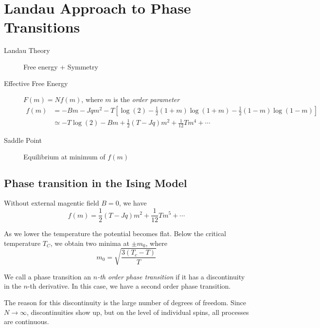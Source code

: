 
\chapter{Landau Approach to Phase Transitions}%
\label{cha:landau_approach_to_phase_transitions}

\begin{description}
  \item[Landau Theory] Free energy + Symmetry
  \item[Effective Free Energy] $F(m) =N f(m)$, where $m$ is the \emph{order parameter}
    \begin{align}
      f(m) &= -Bm - Jqm^2 - T[\log(2) - \frac{1}{2} (1 + m) \log(1 + m) - \frac{1}{2}(1- m) \log(1-m)]\\
      &\simeq - T \log(2) - Bm + \frac{1}{2}(T - Jq) m^2 + \frac{1}{12} Tm^4 + \cdots
    \end{align}
  \item[Saddle Point] Equilibrium at minimum of $f(m)$
\end{description}

\section{Phase transition in the Ising Model}%
\label{sec:phase_transition_in_the_ising_model}

Without external magentic field $B = 0$, we have
\begin{equation}
  f(m) =\frac{1}{2}(T - Jq)m^2 + \frac{1}{12}Tm^5 + \cdots
\end{equation}
 

As we lower the temperature the potential becomes flat. Below the critical temperature $T_C$, we obtain two minima at $\pm m_0$, where
\begin{equation}
  m_0 = \sqrt{\frac{3(T_c - T)}{T}}
\end{equation}

We call a phase transition an \emph{$n$-th order phase transition} if it has a discontinuity in the $n$-th derivative.
In this case, we have a second order phase transition. 

\begin{leftbar}
  \begin{remark}
    The reason for this discontinuity is the large number of degrees of freedom. Since $N \rightarrow \infty$, discontinuities show up, but on the level of individual spins, all processes are continuous.
  \end{remark}
\end{leftbar}

